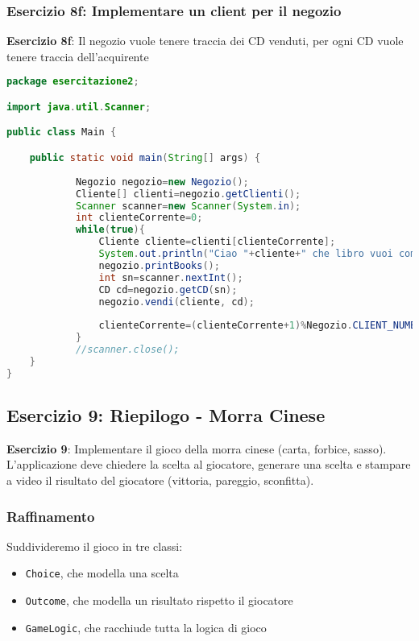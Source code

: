 \documentclass{article}
\begin{document}
\subsubsection{Esercizio 8f: Implementare un client per il negozio}
\begin{framed}
\textbf{Esercizio 8f}: Il negozio vuole tenere traccia dei CD venduti, per ogni CD vuole tenere traccia dell'acquirente
\end{framed}
\begin{lstlisting}[language=Java,escapechar=|]
package esercitazione2;

import java.util.Scanner;

public class Main {

	public static void main(String[] args) {
		
			Negozio negozio=new Negozio();
			Cliente[] clienti=negozio.getClienti();
			Scanner scanner=new Scanner(System.in);
			int clienteCorrente=0;
			while(true){
				Cliente cliente=clienti[clienteCorrente];
				System.out.println("Ciao "+cliente+" che libro vuoi comprare?");
				negozio.printBooks();
				int sn=scanner.nextInt();
				CD cd=negozio.getCD(sn);
				negozio.vendi(cliente, cd);
				
				clienteCorrente=(clienteCorrente+1)%Negozio.CLIENT_NUMBER;
			}
			//scanner.close();
	}
}
\end{lstlisting}

\subsection{Esercizio 9: Riepilogo - Morra Cinese}
\begin{framed}
\textbf{Esercizio 9}: Implementare il gioco della morra cinese (carta, forbice, sasso).
L'applicazione deve chiedere la scelta al giocatore, generare una scelta e stampare a video il risultato del 
giocatore (vittoria, pareggio, sconfitta).
\end{framed}


\subsubsection{Raffinamento}

Suddivideremo il gioco in tre classi: 
\begin{itemize}
	\item \texttt{Choice}, che modella una scelta
	\item \texttt{Outcome}, che modella un risultato rispetto il giocatore
	\item \texttt{GameLogic}, che racchiude tutta la logica di gioco
\end{itemize}
\end{document}
